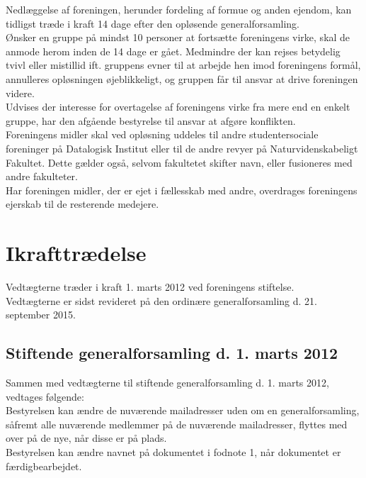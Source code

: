 \documentclass[a4paper,11pt,danish]{article}
\begin{document}
\noindent Nedlæggelse af foreningen, herunder fordeling af formue og anden
ejendom, kan tidligst træde i kraft 14 dage efter den opløsende generalforsamling.\\

\noindent Ønsker en gruppe på mindst 10 personer at fortsætte foreningens
virke, skal de anmode herom inden de 14 dage er gået. Medmindre der kan rejses
betydelig tvivl eller mistillid ift. gruppens evner til at arbejde hen imod
foreningens formål, annulleres opløsningen øjeblikkeligt, og gruppen får til
ansvar at drive foreningen videre.\\

\noindent Udvises der interesse for overtagelse af foreningens virke fra mere
end en enkelt gruppe, har den afgående bestyrelse til ansvar at afgøre
konflikten.\\

\noindent Foreningens midler skal ved opløsning uddeles til andre
studentersociale foreninger på Datalogisk Institut eller til de andre revyer
på Naturvidenskabeligt Fakultet. Dette gælder også, selvom fakultetet skifter
navn, eller fusioneres med andre fakulteter. \\

\noindent Har foreningen midler, der er ejet i fællesskab med andre, overdrages
foreningens ejerskab til de resterende medejere. 

\section{Ikrafttrædelse}
Vedtægterne træder i kraft 1. marts 2012 ved foreningens stiftelse. \\

\noindent Vedtægterne er sidst revideret på den ordinære generalforsamling d.
21. september 2015.

\newpage

\begin{appendices}

\section{Stiftende generalforsamling d. 1. marts 2012}
\label{app:foundingassembly}

Sammen med vedtægterne til stiftende generalforsamling d. 1. marts 2012,
vedtages følgende:\\

\noindent Bestyrelsen kan ændre de nuværende mailadresser uden om en
generalforsamling, såfremt alle nuværende medlemmer på de nuværende
mailadresser, flyttes med over på de nye, når disse er på plads.\\

\noindent Bestyrelsen kan ændre navnet på dokumentet i fodnote 1, når
dokumentet er færdigbearbejdet.

\end{appendices}
\end{document}
